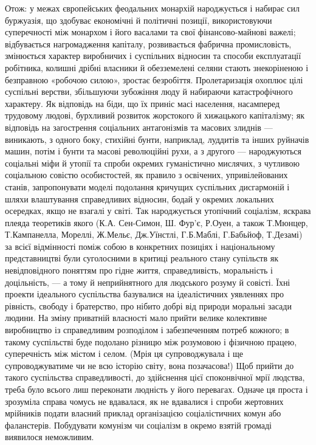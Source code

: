 Отож: у межах європейських феодальних монархій народжується і набирає 
сил буржуазія, що здобуває економічні й політичні позиції, 
використовуючи суперечності між монархом і його васалами та свої 
фінансово-майнові важелі; відбувається нагромадження капіталу, 
розвивається фабрична промисловість, змінюється характер виробничих 
і суспільних відносин та способи експлуатації робітника, колишні 
дрібні власники й обезземелені селяни стають знекоріненою і 
безправною «робочою силою», зростає безробіття. Пролетаризація 
охоплює цілі суспільні верстви, збільшуючи зубожіння люду й набираючи 
катастрофічного характеру. Як відповідь на біди, що їх приніс масі 
населення, насамперед трудовому людові, бурхливий розвиток 
жорстокого й хижацького капіталізму; як відповідь на загострення 
соціальних антагонізмів та масових злиднів — виникають, з одного 
боку, стихійні бунти, наприклад, луддитів та інших руйначів машин, 
потім і бунти та масові революційні рухи, а з другого — народжуються 
соціальні міфи й утопії та спроби окремих гуманістично мислячих, з 
чутливою соціальною совістю особистостей, як правило з освічених, 
упривілейованих станів, запропонувати моделі подолання кричущих 
суспільних дисгармоній і шляхи влаштування справедливих відносин, 
бодай у окремих локальних осередках, якщо не взагалі у світі. Так 
народжується утопічний соціалізм, яскрава плеяда теоретиків якого 
(К.А. Сен-Симон, Ш. Фур'є, Р.Оуен, а також Т.Мюнцер, Т.Кампанелла, Мореллі, 
Ж.Мельє, Дж.Уїнстлі, Г.Б.Маблі, Г.Бабьйоф, Т.Дезамі) за всієї відмінності 
поміж собою в конкретних позиціях і національному представництві 
були суголосними в критиці реального стану супільств як 
невідповідного поняттям про гідне життя, справедливість, моральність 
і доцільність, — а тому й неприйнятного для людського розуму й 
совісті. Їхні проекти ідеального суспільства базувалися на 
ідеалістичних уявленнях про рівність, свободу і братерство, про 
нібито добрі від природи моральні засади людини. На зміну приватній 
власності мало прийти велике колективне виробництво із справедливим 
розподілом і забезпеченням потреб кожного; в такому суспільстві буде 
подолано різницю між розумовою і фізичною працею, суперечність між 
містом і селом. (Мрія ця супроводжувала і ще супроводжуватиме чи не всю 
історію світу, вона позачасова!) Щоб прийти до такого суспільства 
справедливості, до здійснення цієї споконвічної мрії людства, треба 
було всього лиш переконати людність у його перевагах. Одначе ця проста 
і зрозуміла справа чомусь не вдавалася, як не вдавалися і спроби 
жертовних мрійників подати власний приклад організацією 
соціалістичних комун або фаланстерів. Побудувати комунізм чи 
соціалізм в окремо взятій громаді виявилося неможливим.


